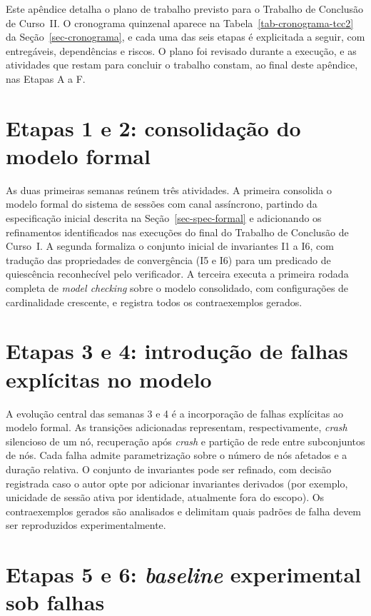 
Este apêndice detalha o plano de trabalho previsto para o Trabalho de Conclusão de Curso~II. O cronograma quinzenal aparece na Tabela~\ref{tab-cronograma-tcc2} da Seção~\ref{sec-cronograma}, e cada uma das seis etapas é explicitada a seguir, com entregáveis, dependências e riscos. O plano foi revisado durante a execução, e as atividades que restam para concluir o trabalho constam, ao final deste apêndice, nas Etapas A a F.

\section*{Etapas 1 e 2: consolidação do modelo formal}
\label{ap-tcc2-etapa1}

As duas primeiras semanas reúnem três atividades. A primeira consolida o modelo formal do sistema de sessões com canal assíncrono, partindo da especificação inicial descrita na Seção~\ref{sec-spec-formal} e adicionando os refinamentos identificados nas execuções do final do Trabalho de Conclusão de Curso~I. A segunda formaliza o conjunto inicial de invariantes I1 a I6, com tradução das propriedades de convergência (I5 e I6) para um predicado de quiescência reconhecível pelo verificador. A terceira executa a primeira rodada completa de \emph{model checking} sobre o modelo consolidado, com configurações de cardinalidade crescente, e registra todos os contraexemplos gerados.

\section*{Etapas 3 e 4: introdução de falhas explícitas no modelo}
\label{ap-tcc2-etapa3}

A evolução central das semanas 3 e 4 é a incorporação de falhas explícitas ao modelo formal. As transições adicionadas representam, respectivamente, \emph{crash} silencioso de um nó, recuperação após \emph{crash} e partição de rede entre subconjuntos de nós. Cada falha admite parametrização sobre o número de nós afetados e a duração relativa. O conjunto de invariantes pode ser refinado, com decisão registrada caso o autor opte por adicionar invariantes derivados (por exemplo, unicidade de sessão ativa por identidade, atualmente fora do escopo). Os contraexemplos gerados são analisados e delimitam quais padrões de falha devem ser reproduzidos experimentalmente.

\section*{Etapas 5 e 6: \emph{baseline} experimental sob falhas}
\label{ap-tcc2-etapa5}

